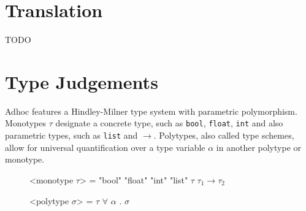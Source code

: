 \documentclass[11pt,a4paper]{article}
\begin{document}
\section{Translation}

TODO



\section{Type Judgements}

Adhoc features a Hindley-Milner type system with parametric polymorphism.
Monotypes $\tau$ designate a concrete type, such as \verb|bool|, \verb|float|,
\verb|int| and also parametric types, such as \verb|list| and $\rightarrow$.
Polytypes, also called type schemes, allow for universal quantification over
a type variable $\alpha$ in another polytype or monotype.




\begin{figure}[H]
\small
\setlength{\grammarindent}{10em}
\begin{grammar}
<monotype $\tau$> = "bool"
    \alt "float"
    \alt "int"
    \alt "list" $\tau$
    \alt $\tau_1 \rightarrow \tau_2$

<polytype $\sigma$> = $\tau$
    \alt $\forall$ $\alpha$ . $\sigma$
\end{grammar}
\end{figure}
\end{document}

